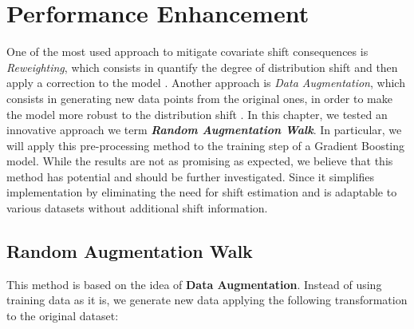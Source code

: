 \chapter{Performance Enhancement}

One of the most used approach to mitigate covariate shift consequences is \textit{Reweighting}, which consists in quantify the degree of distribution shift and then apply a correction to the model \cite{zhang}. Another approach is \textit{Data Augmentation}, which consists in generating new data points from the original ones, in order to make the model more robust to the distribution shift \cite{zhao}. In this chapter, we tested an innovative approach we term \textbf{\textit{Random Augmentation Walk}}. In particular, we will apply this pre-processing method to the training step of a Gradient Boosting model. While the results are not as promising as expected, we believe that this method has potential and should be further investigated. Since it simplifies implementation by eliminating the need for shift estimation and is adaptable to various datasets without additional shift information.


\section{Random Augmentation Walk}

This method is based on the idea of \textbf{Data Augmentation}. Instead of using training data as it is, we generate new data applying the following transformation to the original dataset:

